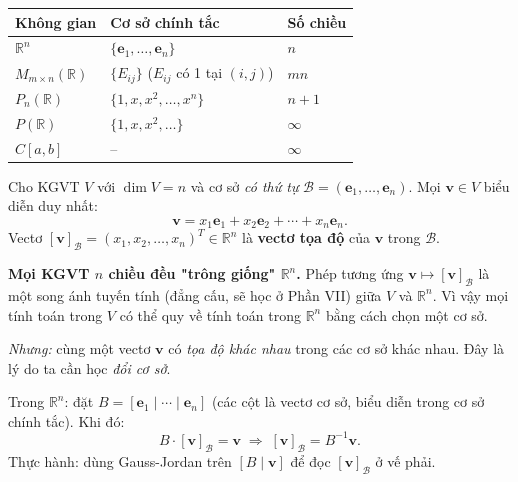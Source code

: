 \documentclass[12pt,a4paper]{article}
\begin{document}
\begin{vidu}[title={Số chiều các KGVT thông dụng}]
\begin{center}
\begin{tabular}{lll}
\toprule
Không gian & Cơ sở chính tắc & Số chiều \\
\midrule
$\mathbb{R}^n$ & $\{\mathbf{e}_1, \ldots, \mathbf{e}_n\}$ & $n$ \\
$M_{m\times n}(\mathbb{R})$ & $\{E_{ij}\}$ ($E_{ij}$ có 1 tại $(i,j)$) & $mn$ \\
$P_n(\mathbb{R})$ & $\{1, x, x^2, \ldots, x^n\}$ & $n+1$ \\
$P(\mathbb{R})$ & $\{1, x, x^2, \ldots\}$ & $\infty$ \\
$C[a,b]$ & -- & $\infty$ \\
\bottomrule
\end{tabular}
\end{center}
\end{vidu}

\begin{dinhnghia}
  Cho KGVT $V$ với $\dim V = n$ và cơ sở \emph{có thứ tự} $\mathcal{B} = (\mathbf{e}_1, \ldots, \mathbf{e}_n)$. Mọi $\mathbf{v} \in V$ biểu diễn duy nhất:
  \[
    \mathbf{v} = x_1 \mathbf{e}_1 + x_2 \mathbf{e}_2 + \cdots + x_n \mathbf{e}_n.
  \]
  Vectơ $[\mathbf{v}]_{\mathcal{B}} = (x_1, x_2, \ldots, x_n)^T \in \mathbb{R}^n$ là \textbf{vectơ tọa độ} của $\mathbf{v}$ trong $\mathcal{B}$.
\end{dinhnghia}

\begin{ynghia}
\textbf{Mọi KGVT $n$ chiều đều "trông giống" $\mathbb{R}^n$.} Phép tương ứng $\mathbf{v} \mapsto [\mathbf{v}]_\mathcal{B}$ là một song ánh tuyến tính (đẳng cấu, sẽ học ở Phần VII) giữa $V$ và $\mathbb{R}^n$. Vì vậy mọi tính toán trong $V$ có thể quy về tính toán trong $\mathbb{R}^n$ bằng cách chọn một cơ sở.

\emph{Nhưng:} cùng một vectơ $\mathbf{v}$ có \emph{tọa độ khác nhau} trong các cơ sở khác nhau. Đây là lý do ta cần học \emph{đổi cơ sở}.
\end{ynghia}

\begin{phuongphap}[title={Tìm tọa độ của $\mathbf{v}$ trong cơ sở $\mathcal{B}$}]
Trong $\mathbb{R}^n$: đặt $B = [\mathbf{e}_1 \mid \cdots \mid \mathbf{e}_n]$ (các cột là vectơ cơ sở, biểu diễn trong cơ sở chính tắc). Khi đó:
\[
  B \cdot [\mathbf{v}]_{\mathcal{B}} = \mathbf{v} \;\Longrightarrow\; [\mathbf{v}]_{\mathcal{B}} = B^{-1} \mathbf{v}.
\]
Thực hành: dùng Gauss-Jordan trên $[B \mid \mathbf{v}]$ để đọc $[\mathbf{v}]_\mathcal{B}$ ở vế phải.
\end{phuongphap}
\end{document}
